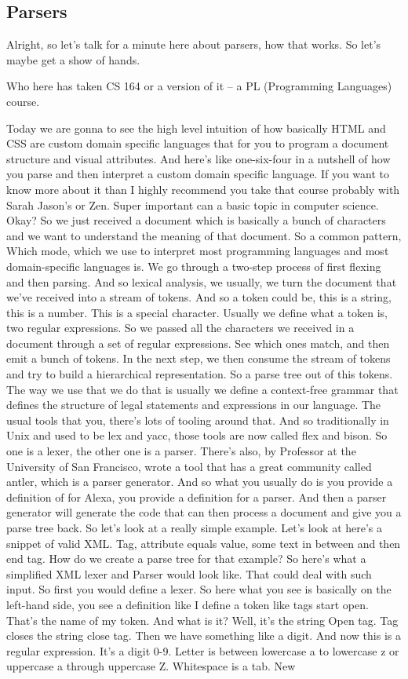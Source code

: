 \subsection{Parsers}
Alright, so let's talk for a minute here about parsers, how that works. So let's maybe get a show of hands. 
\begin{shaded}
Who here has taken CS 164 or a version of it -- a PL (Programming Languages) course.
\end{shaded}
Today we are gonna to see the high level intuition of how basically HTML and CSS are custom domain specific languages that for you to program a document structure and visual attributes. And here's like one-six-four in a nutshell of how you parse and then interpret a custom domain specific language. If you want to know more about it than I highly recommend you take that course probably with Sarah Jason's or Zen. Super important can a basic topic in computer science. Okay? So we just received a document which is basically a bunch of characters and we want to understand the meaning of that document. So a common pattern, Which mode, which we use to interpret most programming languages and most domain-specific languages is. We go through a two-step process of first flexing and then parsing. And so lexical analysis, we usually, we turn the document that we've received into a stream of tokens. And so a token could be, this is a string, this is a number. This is a special character. Usually we define what a token is, two regular expressions. So we passed all the characters we received in a document through a set of regular expressions. See which ones match, and then emit a bunch of tokens. In the next step, we then consume the stream of tokens and try to build a hierarchical representation. So a parse tree out of this tokens. The way we use that we do that is usually we define a context-free grammar that defines the structure of legal statements and expressions in our language. The usual tools that you, there's lots of tooling around that. And so traditionally in Unix and used to be lex and yacc, those tools are now called flex and bison. So one is a lexer, the other one is a parser. There's also, by Professor at the University of San Francisco, wrote a tool that has a great community called antler, which is a parser generator. And so what you usually do is you provide a definition of for Alexa, you provide a definition for a parser. And then a parser generator will generate the code that can then process a document and give you a parse tree back. So let's look at a really simple example. Let's look at here's a snippet of valid XML. Tag, attribute equals value, some text in between and then end tag. How do we create a parse tree for that example? So here's what a simplified XML lexer and Parser would look like. That could deal with such input. So first you would define a lexer. So here what you see is basically on the left-hand side, you see a definition like I define a token like tags start open. That's the name of my token. And what is it? Well, it's the string Open tag. Tag closes the string close tag. Then we have something like a digit. And now this is a regular expression. It's a digit 0-9. Letter is between lowercase a to lowercase z or uppercase a through uppercase Z. Whitespace is a tab. New 